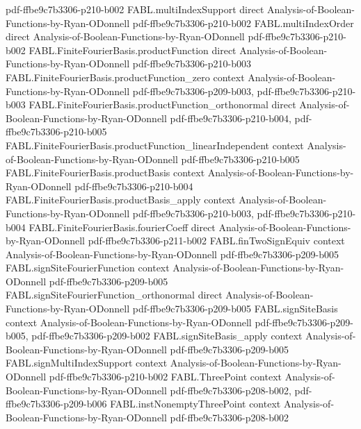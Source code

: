 \begin{theorem}
  {pdf-ffbe9c7b3306-p210-b002}
\proofstep
  {FABL.multiIndexSupport}
  {direct}
  {Analysis-of-Boolean-Functions-by-Ryan-ODonnell}
  {pdf-ffbe9c7b3306-p210-b002}
\proofstep
  {FABL.multiIndexOrder}
  {direct}
  {Analysis-of-Boolean-Functions-by-Ryan-ODonnell}
  {pdf-ffbe9c7b3306-p210-b002}
\proofstep
  {FABL.FiniteFourierBasis.productFunction}
  {direct}
  {Analysis-of-Boolean-Functions-by-Ryan-ODonnell}
  {pdf-ffbe9c7b3306-p210-b003}
\proofstep
  {FABL.FiniteFourierBasis.productFunction_zero}
  {context}
  {Analysis-of-Boolean-Functions-by-Ryan-ODonnell}
  {pdf-ffbe9c7b3306-p209-b003,
    pdf-ffbe9c7b3306-p210-b003}
\proofstep
  {FABL.FiniteFourierBasis.productFunction_orthonormal}
  {direct}
  {Analysis-of-Boolean-Functions-by-Ryan-ODonnell}
  {pdf-ffbe9c7b3306-p210-b004,
    pdf-ffbe9c7b3306-p210-b005}
\proofstep
  {FABL.FiniteFourierBasis.productFunction_linearIndependent}
  {context}
  {Analysis-of-Boolean-Functions-by-Ryan-ODonnell}
  {pdf-ffbe9c7b3306-p210-b005}
\proofstep
  {FABL.FiniteFourierBasis.productBasis}
  {context}
  {Analysis-of-Boolean-Functions-by-Ryan-ODonnell}
  {pdf-ffbe9c7b3306-p210-b004}
\proofstep
  {FABL.FiniteFourierBasis.productBasis_apply}
  {context}
  {Analysis-of-Boolean-Functions-by-Ryan-ODonnell}
  {pdf-ffbe9c7b3306-p210-b003,
    pdf-ffbe9c7b3306-p210-b004}
\proofstep
  {FABL.FiniteFourierBasis.fourierCoeff}
  {direct}
  {Analysis-of-Boolean-Functions-by-Ryan-ODonnell}
  {pdf-ffbe9c7b3306-p211-b002}
\proofstep
  {FABL.finTwoSignEquiv}
  {context}
  {Analysis-of-Boolean-Functions-by-Ryan-ODonnell}
  {pdf-ffbe9c7b3306-p209-b005}
\proofstep
  {FABL.signSiteFourierFunction}
  {context}
  {Analysis-of-Boolean-Functions-by-Ryan-ODonnell}
  {pdf-ffbe9c7b3306-p209-b005}
\proofstep
  {FABL.signSiteFourierFunction_orthonormal}
  {direct}
  {Analysis-of-Boolean-Functions-by-Ryan-ODonnell}
  {pdf-ffbe9c7b3306-p209-b005}
\proofstep
  {FABL.signSiteBasis}
  {context}
  {Analysis-of-Boolean-Functions-by-Ryan-ODonnell}
  {pdf-ffbe9c7b3306-p209-b005,
    pdf-ffbe9c7b3306-p209-b002}
\proofstep
  {FABL.signSiteBasis_apply}
  {context}
  {Analysis-of-Boolean-Functions-by-Ryan-ODonnell}
  {pdf-ffbe9c7b3306-p209-b005}
\proofstep
  {FABL.signMultiIndexSupport}
  {context}
  {Analysis-of-Boolean-Functions-by-Ryan-ODonnell}
  {pdf-ffbe9c7b3306-p210-b002}
\proofstep
  {FABL.ThreePoint}
  {context}
  {Analysis-of-Boolean-Functions-by-Ryan-ODonnell}
  {pdf-ffbe9c7b3306-p208-b002,
    pdf-ffbe9c7b3306-p209-b006}
\proofstep
  {FABL.instNonemptyThreePoint}
  {context}
  {Analysis-of-Boolean-Functions-by-Ryan-ODonnell}
  {pdf-ffbe9c7b3306-p208-b002}

\end{theorem}
